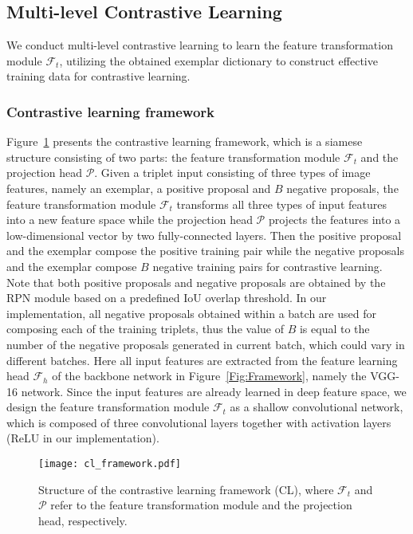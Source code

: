 \documentclass[journal]{IEEEtran}
\begin{document}
\subsection{Multi-level Contrastive Learning}

We conduct multi-level contrastive learning to learn the feature transformation module $\mathcal{F}_t$, utilizing the obtained exemplar dictionary to construct effective training data for contrastive learning.  

\subsubsection{Contrastive learning framework}
Figure~\ref{Fig:CL} presents the contrastive learning framework, which is a siamese structure consisting of two parts: the feature transformation module $\mathcal{F}_t$ and the projection head $\mathcal{P}$. 
Given a triplet input consisting of three types of image features, namely an exemplar, a positive proposal and $B$ negative proposals, the feature transformation module $\mathcal{F}_t$ transforms all three types of input features into a new feature space while the projection head $\mathcal{P}$ projects the features into a low-dimensional vector by two fully-connected layers. Then the positive proposal and the exemplar compose the positive training pair while the negative proposals and the exemplar compose $B$ negative training pairs for contrastive learning. Note that both positive proposals and negative proposals are obtained by the RPN module based on a predefined IoU overlap threshold. In our implementation, all negative proposals obtained within a batch are used for composing each of the training triplets, thus the value of $B$ is equal to the number of the negative proposals generated in current batch, which could vary in different batches.
Here all input features are extracted from the feature learning head $\mathcal{F}_h$ of the backbone network in Figure~\ref{Fig:Framework}, namely the VGG-16 network. Since the input features are already learned in deep feature space, we design the feature transformation module $\mathcal{F}_t$ as a shallow convolutional network, which is composed of three convolutional layers together with activation layers (ReLU in our implementation). 

\begin{figure}[t]
\centering
    \texttt{[image: cl\_framework.pdf]}
    \vspace{-20pt}
    \caption{Structure of the contrastive learning framework (CL), where $\mathcal{F}_t$ and $ \mathcal{P} $ refer to the feature transformation module and the projection head, respectively. }
    \vspace{-10pt}
\label{Fig:CL}
\end{figure}
\end{document}

